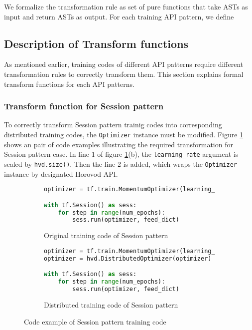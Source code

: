 We formalize the transformation rule as set of pure functions
that take ASTs as input and return ASTs as output.
For each training API pattern, we define  

\subsection{Description of Transform functions}

As mentioned earlier, training codes of different API patterns
require different transformation rules to correctly transform them.
This section explains formal transform functions for each API patterns.

\subsubsection{Transform function for Session pattern}

To correctly transform Session pattern trainig codes into corresponding
distributed training codes, the {\tt Optimizer} instance must be modified.
Figure \ref{fig:trans:sessiontrans} shows an pair of code examples
illustrating the required transformation for Session pattern case.
In line 1 of figure \ref{fig:trans:sessiontrans}(b),
the {\tt learning\_rate} argument is scaled by {\tt hvd.size()}.
Then the line 2 is added, which wraps the {\tt Optimizer} instance
by designated Horovod API.

\begin{figure}[ht!]
  \begin{subfigure}[t]{0.45\textwidth}
    \begin{lstlisting}[language=Python]
optimizer = tf.train.MomentumOptimizer(learning_rate = 0.01)

with tf.Session() as sess:
    for step in range(num_epochs): 
        sess.run(optimizer, feed_dict)
    \end{lstlisting}
    \caption{Original training code of Session pattern}
  \end{subfigure}
  \hspace{5mm}
  \begin{subfigure}[t]{0.45\textwidth}
    \begin{lstlisting}[language=Python]
optimizer = tf.train.MomentumOptimizer(learning_rate = 0.01 * hvd.size())
optimizer = hvd.DistributedOptimizer(optimizer)

with tf.Session() as sess:
    for step in range(num_epochs): 
        sess.run(optimizer, feed_dict)
    \end{lstlisting}
    \caption{Distributed training code of Session pattern}
  \end{subfigure}
  \caption{Code example of Session pattern training code}
  \label{fig:trans:sessiontrans}
\end{figure}

